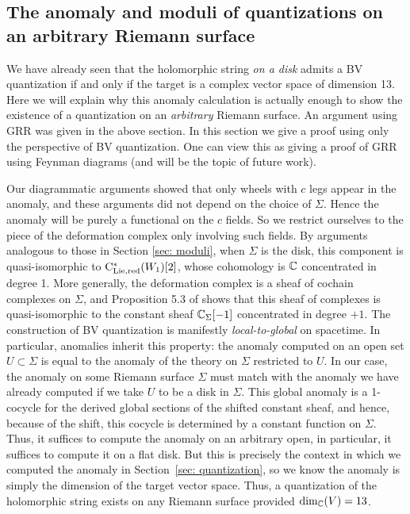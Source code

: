 \subsection{The anomaly and moduli of quantizations on an arbitrary Riemann surface}

We have already seen that the holomorphic string {\it on a disk} admits a BV quantization if and only if the target is a complex vector space of dimension 13.
Here we will explain why this anomaly calculation is actually enough to show the existence of a quantization on an {\it arbitrary} Riemann surface. 
An argument using GRR was given in the above section. 
In this section we give a proof using only the perspective of BV quantization.
One can view this as giving a proof of GRR using Feynman diagrams (and will be the topic of future work). 

Our diagrammatic arguments showed that only wheels with $c$ legs appear in the anomaly,
and these arguments did not depend on the choice of $\Sigma$. 
Hence the anomaly will be purely a functional on the $c$ fields.
So we restrict ourselves to the piece of the deformation complex only involving such fields.
By arguments analogous to those in Section \ref{sec: moduli}, 
when $\Sigma$ is the disk,
this component is quasi-isomorphic to ${\rm C}_{\rm Lie,red}^*(W_1)[2]$,
whose cohomology is $\mathbb C$ concentrated in degree 1.
More generally, the deformation complex is a sheaf of cochain complexes on $\Sigma$, 
and Proposition 5.3 of \cite{BWvir} shows that this sheaf of complexes is quasi-isomorphic to the constant sheaf $\mathbb C_\Sigma[-1]$ concentrated in degree $+1$. 
The construction of BV quantization is manifestly {\em local-to-global} on spacetime. 
In particular, anomalies inherit this property: the anomaly computed on an open set $U \subset \Sigma$ is equal to the anomaly of the theory on $\Sigma$ restricted to $U$. 
In our case, the anomaly on some Riemann surface $\Sigma$ must match with the anomaly we have already computed if we take $U$ to be a disk in $\Sigma$.
This global anomaly is a 1-cocycle for the derived global sections of the shifted constant sheaf, 
and hence, because of the shift, this cocycle is determined by a constant function on $\Sigma$.
Thus, it suffices to compute the anomaly on an arbitrary open, 
in particular, it suffices to compute it on a flat disk. 
But this is precisely the context in which we computed the anomaly in Section~\ref{sec: quantization}, 
so we know the anomaly is simply the dimension of the target vector space.
Thus, a quantization of the holomorphic string exists on any Riemann surface provided $\dim_{\mathbb C}(V) = 13$. 

